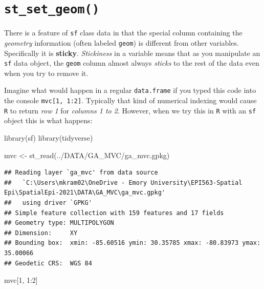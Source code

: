 \documentclass[
]{book}
\newenvironment{Shaded}{\begin{snugshade}}{\end{snugshade}}
\newcommand{\DecValTok}[1]{\textcolor[rgb]{0.00,0.00,0.81}{#1}}
\newcommand{\FunctionTok}[1]{\textcolor[rgb]{0.00,0.00,0.00}{#1}}
\newcommand{\NormalTok}[1]{#1}
\newcommand{\OtherTok}[1]{\textcolor[rgb]{0.56,0.35,0.01}{#1}}
\newcommand{\SpecialCharTok}[1]{\textcolor[rgb]{0.00,0.00,0.00}{#1}}
\newcommand{\StringTok}[1]{\textcolor[rgb]{0.31,0.60,0.02}{#1}}
\begin{document}
\hypertarget{st_set_geom}{%
\section{\texorpdfstring{\texttt{st\_set\_geom()}}{st\_set\_geom()}}\label{st_set_geom}}

There is a feature of \texttt{sf} class data in that the special column containing the \emph{geometry} information (often labeled \texttt{geom}) is different from other variables. Specifically it is \textbf{sticky}. \emph{Stickiness} in a variable means that as you manipulate an \texttt{sf} data object, the \texttt{geom} column almost always \emph{sticks} to the rest of the data even when you try to remove it.

Imagine what would happen in a regular \texttt{data.frame} if you typed this code into the console \texttt{mvc{[}1,\ 1:2{]}}. Typically that kind of numerical indexing would cause \texttt{R} to return \emph{row 1} for \emph{columns 1 to 2}. However, when we try this in \texttt{R} with an \texttt{sf} object this is what happens:

\begin{Shaded}
\begin{Highlighting}[]
\FunctionTok{library}\NormalTok{(sf)}
\FunctionTok{library}\NormalTok{(tidyverse)}

\NormalTok{mvc }\OtherTok{\textless{}{-}} \FunctionTok{st\_read}\NormalTok{(}\StringTok{\textquotesingle{}../DATA/GA\_MVC/ga\_mvc.gpkg\textquotesingle{}}\NormalTok{)}
\end{Highlighting}
\end{Shaded}

\begin{verbatim}
## Reading layer `ga_mvc' from data source 
##   `C:\Users\mkram02\OneDrive - Emory University\EPI563-Spatial Epi\SpatialEpi-2021\DATA\GA_MVC\ga_mvc.gpkg' 
##   using driver `GPKG'
## Simple feature collection with 159 features and 17 fields
## Geometry type: MULTIPOLYGON
## Dimension:     XY
## Bounding box:  xmin: -85.60516 ymin: 30.35785 xmax: -80.83973 ymax: 35.00066
## Geodetic CRS:  WGS 84
\end{verbatim}

\begin{Shaded}
\begin{Highlighting}[]
\NormalTok{mvc[}\DecValTok{1}\NormalTok{, }\DecValTok{1}\SpecialCharTok{:}\DecValTok{2}\NormalTok{]}
\end{Highlighting}
\end{Shaded}
\end{document}
